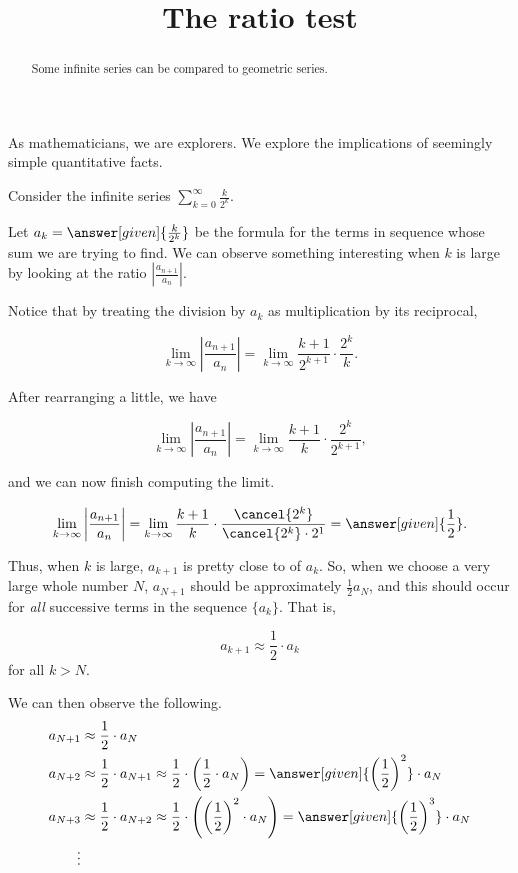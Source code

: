 \documentclass{ximera}
\title[Dig-In:]{The ratio test}
\begin{document}
\begin{abstract}
Some infinite series can be compared to geometric series.
\end{abstract}
\maketitle

As mathematicians, we are explorers. We explore the implications of
seemingly simple quantitative facts. 

\begin{exploration}
Consider the infinite series $\sum_{k=0}^\infty \frac{k}{2^k}$. 

Let $a_k = \answer[given]{\frac{k}{2^k}}$ be the formula for the terms in sequence whose sum we are trying to find.  We can observe something interesting when $k$ is large by looking at the ratio $\left|\frac{a_{n+1}}{a_n}\right|$.

Notice that by treating the division by $a_k$ as multiplication by its reciprocal, 

\[
\lim_{k \to \infty} \left|\frac{a_{n+1}}{a_n}\right| = \lim_{k \to \infty} \frac{k+1}{2^{k+1}} \cdot \frac{2^k}{k}.
\]

After rearranging a little, we have

\[
\lim_{k \to \infty} \left|\frac{a_{n+1}}{a_n}\right| = \lim_{k \to \infty} \frac{k+1}{k} \cdot \frac{2^k}{2^{k+1}},
\]

and we can now finish computing the limit.

\[
\lim_{k \to \infty} \left|\frac{a_{n+1}}{a_n}\right| = \lim_{k \to \infty} \frac{k+1}{k} \cdot \frac{\cancel{2^k}}{\cancel{2^k} \cdot 2^1} = \answer[given]{\frac{1}{2}}.
\]

Thus, when $k$ is large, $a_{k+1}$ is pretty close to
 of $a_{k}$.  
So, when we choose a very large whole number $N$, $a_{N+1}$ should be approximately $\frac{1}{2} a_N$, and this should occur for \emph{all} successive terms in the sequence $\{a_k\}$.  That is, 

\[
a_{k+1} \approx  \frac{1}{2} \cdot a_k
\]
for all $k>N$.

We can then observe the following.
\begin{align*}
  a_{N+1} &\approx  \frac{1}{2} \cdot a_N \\
  a_{N+2} &\approx  \frac{1}{2} \cdot a_{N+1}  \approx \frac{1}{2} \cdot \left(\frac{1}{2} \cdot a_N\right) = \answer[given]{\left(\frac{1}{2}\right)^2} \cdot a_N \\
  a_{N+3} &\approx  \frac{1}{2} \cdot a_{N+2}  \approx \frac{1}{2} \cdot \left( \left(\frac{1}{2}\right)^2 \cdot a_N\right) = \answer[given]{\left(\frac{1}{2}\right)^3} \cdot a_N \\
\vdots
\end{align*}


\end{exploration}
\end{document}
